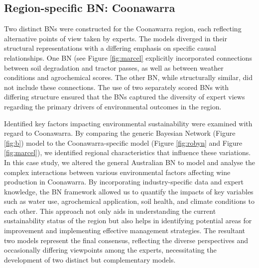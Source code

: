 \subsection{Region-specific BN: Coonawarra}

Two distinct BNs were constructed for the Coonawarra region, each reflecting alternative points of view taken by experts. The models diverged in their structural representations with a differing emphasis on specific causal relationships. One BN  (see Figure \ref{fig:marcel} explicitly incorporated connections between soil degradation and tractor passes, as well as between weather conditions and agrochemical scores. The other BN, while structurally similar, did not include these connections. The use of two separately scored BNs with differing structure ensured that the BNs captured the diversity of expert views regarding the primary drivers of environmental outcomes in the region.

Identified key factors impacting environmental sustainability were examined with regard to Coonawarra. By comparing the generic Bayesian Network (Figure \ref{fig:b}) model to the Coonawarra-specific model (Figure \ref{fig:robyn} and Figure \ref{fig:marcel}), we identified regional characteristics that influence these variations. In this case study, we altered the general Australian BN to model and analyse the complex interactions between various environmental factors affecting wine production in Coonawarra. By incorporating industry-specific data and expert knowledge, the BN framework allowed us to quantify the impacts of key variables such as water use, agrochemical application, soil health, and climate conditions to each other. This approach not only aids in understanding the current sustainability status of the region but also helps in identifying potential areas for improvement and implementing effective management strategies. The resultant two models represent the final consensus, reflecting the diverse perspectives and occasionally differing viewpoints among the experts, necessitating the development of two distinct but complementary models.

